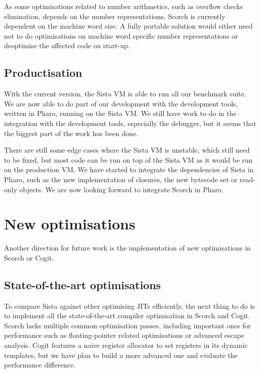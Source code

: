 \documentclass[a4paper,12pt,twoside]{../includes/ThesisStyle}
\begin{document}
As some optimisations related to number arithmetics, such as overflow checks elimination, depends on the number representations, Scorch is currently dependent on the machine word size. A fully portable solution would either need not to do optimisations on machine word specific number representations or deoptimise the affected code on start-up.

\subsection{Productisation}
\label{ss:FWProduct}

With the current version, the Sista VM is able to run all our benchmark suite. We are now able to do part of our development with the development tools, written in Pharo, running on the Sista VM. We still have work to do in the integration with the development tools, especially the debugger, but it seems that the biggest part of the work has been done. 

There are still some edge cases where the Sista VM is unstable, which still need to be fixed, but most code can be run on top of the Sista VM as it would be run on the production VM. We have started to integrate the dependencies of Sista in Pharo, such as the new implementation of closures, the new bytecode set or read-only objects. We are now looking forward to integrate Scorch in Pharo.

\section{New optimisations}
\label{sec:newOpt}

Another direction for future work is the implementation of new optimisations in Scorch or Cogit. 

\subsection{State-of-the-art optimisations}

To compare Sista against other optimising JITs efficiently, the next thing to do is to implement all the state-of-the-art compiler optimisation in Scorch and Cogit. Scorch lacks multiple common optimisation passes, including important ones for performance such as floating-pointer related optimisations or advanced escape analysis. Cogit features a naive register allocator to set registers in its dynamic templates, but we have plan to build a more advanced one and evaluate the performance difference. 
\end{document}
